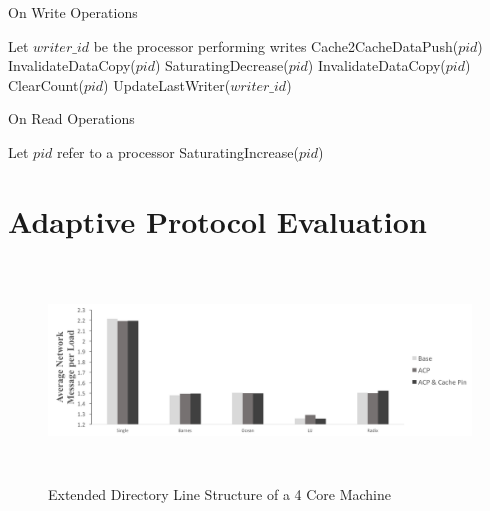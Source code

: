 \documentclass[conference]{IEEEtran}
\begin{document}
\begin{algorithm}
\caption{On Write Operations}
\label{write_operations}
\begin{algorithmic}[1]
\State Let $writer\_id$ be the processor performing writes
     
            \State Cache2CacheDataPush($pid$) 
        \Else
            \State InvalidateDataCopy($pid$) 
        \EndIf
        \State SaturatingDecrease($pid$) 
    \EndFor
\Else
     
        \State InvalidateDataCopy($pid$) 
        \State ClearCount($pid$) 
    \EndFor
    \State UpdateLastWriter($writer\_id$)
\EndIf
\end{algorithmic}
\end{algorithm}

\begin{algorithm}
\caption{On Read Operations}
\label{read_operations}
\begin{algorithmic}[1]
\State Let $pid$ refer to a processor
    \State SaturatingIncrease($pid$) 
\EndFor
\end{algorithmic}
\end{algorithm}



\section{Adaptive Protocol Evaluation}

\begin{figure}[!h]
\centering
\captionsetup{justification=centering}
\includegraphics[width=7.35in,height=2.3in]{avg_network_msg_per_load.png}
\caption{Extended Directory Line Structure of a 4 Core Machine}
\label{123}
\end{figure}
\end{document}
